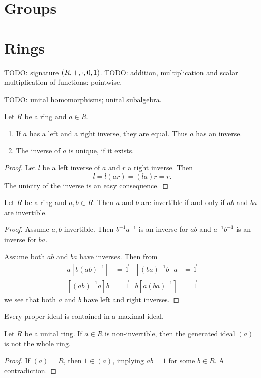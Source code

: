 \chapter{Groups}



\chapter{Rings}
TODO: signature $\left( R,+,\cdot, 0, 1 \right)$.
TODO: addition, multiplication and scalar multiplication of functions: pointwise.

TODO: unital homomorphisms; unital subalgebra.

\begin{lemma}
Let $R$ be a ring and $a\in R$.
\begin{enumerate}
\item If $a$ has a left and a right inverse, they are equal. Thus $a$ has an inverse.
\item The inverse of $a$ is unique, if it exists.
\end{enumerate}
\end{lemma}
\begin{proof}
Let $l$ be a left inverse of $a$ and $r$ a right inverse. Then
\[ l = l(ar) = (la)r = r. \]
The unicity of the inverse is an easy consequence.
\end{proof}

\begin{lemma} \label{productInvertibility}
Let $R$ be a ring and $a,b\in R$. Then $a$ and $b$ are invertible \textup{if and only if} $ab$ and $ba$ are invertible.
\end{lemma}
\begin{proof}
Assume $a,b$ invertible. Then $b^{-1}a^{-1}$ is an inverse for $ab$ and $a^{-1}b^{-1}$ is an inverse for $ba$.

Assume both $ab$ and $ba$ have inverses. Then from
\begin{align*}
a[b(ab)^{-1}] &= \vec{1} & [(ba)^{-1}b]a &= \vec{1} \\
[(ab)^{-1}a]b &= \vec{1} & b[a(ba)^{-1}] &= \vec{1}
\end{align*} 
we see that both $a$ and $b$ have left and right inverses.
\end{proof}

\begin{proposition} \label{everyProperIdealInMaximalIdeal}
Every proper ideal is contained in a maximal ideal.
\end{proposition}

\begin{lemma} \label{nonInvertibleGeneratedIdeals}
Let $R$ be a unital ring. If $a\in R$ is non-invertible, then the generated ideal $(a)$ is not the whole ring.
\end{lemma}
\begin{proof}
If $(a) = R$, then $1\in (a)$, implying $ab=1$ for some $b\in R$. A contradiction.
\end{proof}

